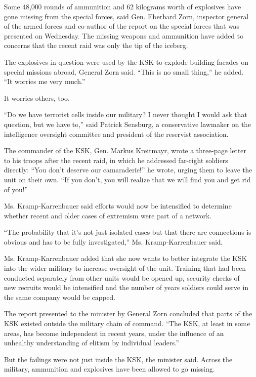 Some 48,000 rounds of ammunition and 62 kilograms worth of explosives
have gone missing from the special forces, said Gen. Eberhard Zorn,
inspector general of the armed forces and co-author of the report on the
special forces that was presented on Wednesday. The missing weapons and
ammunition have added to concerns that the recent raid was only the tip
of the iceberg.

The explosives in question were used by the KSK to explode building
facades on special missions abroad, General Zorn said. ``This is no
small thing,'' he added. ``It worries me very much.''

It worries others, too.

``Do we have terrorist cells inside our military? I never thought I
would ask that question, but we have to,'' said Patrick Sensburg, a
conservative lawmaker on the intelligence oversight committee and
president of the reservist association.

The commander of the KSK, Gen. Markus Kreitmayr, wrote a three-page
letter to his troops after the recent raid, in which he addressed
far-right soldiers directly: ``You don't deserve our camaraderie!'' he
wrote, urging them to leave the unit on their own. ``If you don't, you
will realize that we will find you and get rid of you!''

Ms. Kramp-Karrenbauer said efforts would now be intensified to determine
whether recent and older cases of extremism were part of a network.

``The probability that it's not just isolated cases but that there are
connections is obvious and has to be fully investigated,'' Ms.
Kramp-Karrenbauer said.

Ms. Kramp-Karrenbauer added that she now wants to better integrate the
KSK into the wider military to increase oversight of the unit. Training
that had been conducted separately from other units would be opened up,
security checks of new recruits would be intensified and the number of
years soldiers could serve in the same company would be capped.

The report presented to the minister by General Zorn concluded that
parts of the KSK existed outside the military chain of command. ``The
KSK, at least in some areas, has become independent in recent years,
under the influence of an unhealthy understanding of elitism by
individual leaders.''

But the failings were not just inside the KSK, the minister said. Across
the military, ammunition and explosives have been allowed to go missing.

